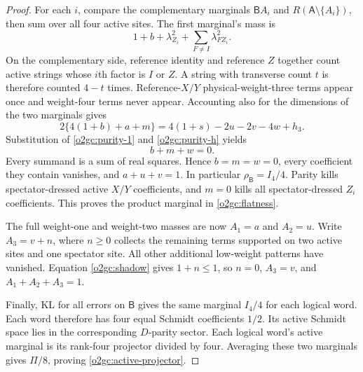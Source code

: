 \begin{proof}
For each \(i\), compare the complementary marginals
\(\mathsf B A_i\) and \(R(\mathsf A\setminus\{A_i\})\), then sum over
all four active sites. The first marginal's mass is
\[
 1+b+\lambda_{Z_i}^2+\sum_{F\ne I}\lambda_{FZ_i}^2.
\]
On the complementary side, reference identity and reference \(Z\)
together count active strings whose \(i\)th factor is \(I\) or \(Z\).
A string with transverse count \(t\) is therefore counted \(4-t\)
times. Reference-\(X/Y\) physical-weight-three terms appear once and
weight-four terms never appear. Accounting also for the dimensions of
the two marginals gives
\begin{equation}
 2\{4(1+b)+a+m\}
 =4(1+s)-2u-2v-4w+h_3.
 \label{o2gc:purity-2}
\end{equation}
Substitution of \eqref{o2gc:purity-1} and \eqref{o2gc:purity-h} yields
\begin{equation}
 b+m+w=0.
 \label{o2gc:purity-sos}
\end{equation}
Every summand is a sum of real squares. Hence \(b=m=w=0\), every
coefficient they contain vanishes, and \(a+u+v=1\). In particular
\(\rho_{\mathsf B}=I_4/4\). Parity kills spectator-dressed active
\(X/Y\) coefficients, and \(m=0\) kills all spectator-dressed \(Z_i\)
coefficients. This proves the product marginal in
\eqref{o2gc:flatness}.

The full weight-one and weight-two masses are now \(A_1=a\) and
\(A_2=u\). Write \(A_3=v+n\), where \(n\ge0\) collects the remaining
terms supported on two active sites and one spectator site. All other
additional low-weight patterns have vanished. Equation
\eqref{o2gc:shadow} gives \(1+n\le1\), so \(n=0\), \(A_3=v\), and
\(A_1+A_2+A_3=1\).

Finally, KL for all errors on \(\mathsf B\) gives the same marginal
\(I_4/4\) for each logical word. Each word therefore has four equal
Schmidt coefficients \(1/2\). Its active Schmidt space lies in the
corresponding \(D\)-parity sector. Each logical word's active marginal
is its rank-four projector divided by four. Averaging these two
marginals gives \(\Pi/8\), proving
\eqref{o2gc:active-projector}.
\end{proof}

